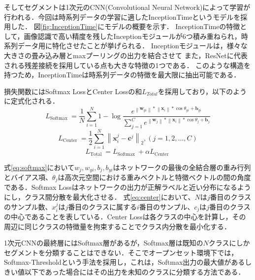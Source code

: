 そしてセグメントは1次元のCNN(Convolutional Neural Network)によって学習が行われる．今回は時系列データの学習に適したInceptionTime\cite{paper:InceptionTime}というモデルを採用した．
図\ref{fig:InceptionTime}にモデルの概要を示す．
InceptionTimeの特徴として，画像認識で高い精度を残したInceptionモジュール\cite{paper:Inception}が6つ積み重ねられ，時系列データ用に特化させたことが挙げられる．
Inceptionモジュールは，様々な大きさの畳み込み層とmaxプーリングの出力を結合させて
また，ResNet\cite{paper:ResNet}に代表される残差接続を採用している点も大きな特徴の1つである．
このような構造を持つため，InceptionTimeは時系列データの特徴を最大限に抽出可能である．

損失関数にはSoftmax LossとCenter Lossの和$L_{Total}$を採用しており，以下のように定式化される\cite{paper:centerloss}．
\begin{equation}\label{eq:softmax}
  {L_{{\text{Softmax }}}} = \frac{1}{N}\sum\limits_{i = 1}^N 1 - \log \frac{{{e^{\left\| {{{\mathbf{w}}_{yi}}} \right\|*\left\| {{{\mathbf{x}}_i}} \right\|*\cos {\theta _{yi}} + {{\mathbf{b}}_{yi}}}}}}{{\sum\limits_{j = 1}^C {{e^{\left\| {{{\mathbf{w}}_j}} \right\|*\left\| {{{\mathbf{x}}_i}} \right\|*\cos {\theta _j} + {{\mathbf{b}}_j}}}} }}
\end{equation}
\begin{equation}\label{eq:center}
  {L_{{\text{Center }}}} = \frac{1}{2}\sum\limits_{i = 1}^N {{{\left\| {{\mathbf{x}}_i^j - {{\mathbf{c}}^j}} \right\|}_2}} ,(j = 1,2, \ldots ,C)
\end{equation}
\begin{equation}{L_{{\text{Total }}}} = {L_{{\text{Softmax }}}} + \alpha {L_{{\text{Center }}}}\end{equation}

式\ref{eq:softmax}において$w_{j} , w_{yi}, b_{j} , b_{yi}$はネットワークの最後の全結合層の重み行列とバイアス項、$\theta_{j}$は高次元空間における重みベクトルと特徴ベクトルの間の角度である．Softmax Lossはネットワークの出力が正解ラベルと近い分布になるようにし，クラス間分散を最大化させる．
式\ref{eq:center}において、$N$は$j$番目のクラスのサンプル数、$x^{j}_{i}$は$j$番目のクラスに属する$i$番目のサンプル、$c_j$は$j$番目のクラスの中心であることを表している．Center Lossは各クラスの中心を計算し，その周辺に同じクラスの特徴量を拘束することでクラス内分散を最小化する．

1次元CNNの最終層にはSoftmax層があるが，Softmax層は既知の$N$クラスにしかセグメントを分類することはできない．そこでオープンセット環境下では，Softmax-Thresholdという手法を採用し，これは，Softmax出力の最大値があるしきい値以下であった場合にはその出力を未知のクラスに分類する方法である．


